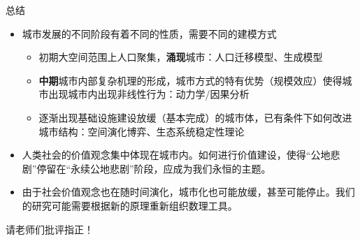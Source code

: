 \documentclass[utf8]{ctexbeamer}
\begin{document}
\begin{frame}{总结}
    \begin{itemize}
        \item 城市发展的不同阶段有着不同的性质，需要不同的建模方式
        \begin{itemize}
            \item 初期大空间范围上人口聚集，\textbf{涌现}城市：人口迁移模型、生成模型
            \item \textbf{中期}城市内部复杂机理的形成，城市方式的特有优势（规模效应）使得城市出现城市内出现非线性行为：动力学/因果分析
            \item 逐渐出现基础设施建设放缓（基本完成）的城市体，已有条件下如何改进城市结构：空间演化博弈、生态系统稳定性理论
        \end{itemize}
        \item 人类社会的价值观念集中体现在城市内。如何进行价值建设，使得“公地悲剧”停留在“永续公地悲剧”阶段，应成为我们永恒的主题。
        \item 由于社会价值观念也在随时间演化，城市化也可能放缓，甚至可能停止。我们的研究可能需要根据新的原理重新组织数理工具。
    \end{itemize}
\end{frame}

\begin{frame}
    \begin{center}
    \LARGE{请老师们批评指正！}
    \end{center}
    
\end{frame}



\end{document}
